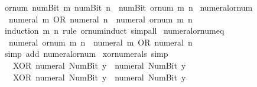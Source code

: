 \begin{isabellebody}
{\isacharbar}{\kern0pt}\ {\isacartoucheopen}or{\isacharunderscore}{\kern0pt}num\ {\isacharparenleft}{\kern0pt}num{\isachardot}{\kern0pt}Bit{}\ m{\isacharparenright}{\kern0pt}\ {\isacharparenleft}{\kern0pt}num{\isachardot}{\kern0pt}Bit{}\ n{\isacharparenright}{\kern0pt}\ {\isacharequal}{\kern0pt}\ num{\isachardot}{\kern0pt}Bit{}\ {\isacharparenleft}{\kern0pt}or{\isacharunderscore}{\kern0pt}num\ m\ n{\isacharparenright}{\kern0pt}{\isacartoucheclose}\isanewline
\isanewline
{}\isamarkupfalse%
\ numeral{\isacharunderscore}{\kern0pt}or{\isacharunderscore}{\kern0pt}num{\isacharcolon}{\kern0pt}\isanewline
\ \ {\isacartoucheopen}numeral\ m\ OR\ numeral\ n\ {\isacharequal}{\kern0pt}\ numeral\ {\isacharparenleft}{\kern0pt}or{\isacharunderscore}{\kern0pt}num\ m\ n{\isacharparenright}{\kern0pt}{\isacartoucheclose}\isanewline
%
\isadelimproof
\ \ %
\endisadelimproof
%
\isatagproof
{}\isamarkupfalse%
\ {\isacharparenleft}{\kern0pt}induction\ m\ n\ rule{\isacharcolon}{\kern0pt}\ or{\isacharunderscore}{\kern0pt}num{\isachardot}{\kern0pt}induct{\isacharparenright}{\kern0pt}\ simp{\isacharunderscore}{\kern0pt}all%
\endisatagproof
{\isafoldproof}%
%
\isadelimproof
\isanewline
%
\endisadelimproof
\isanewline
{}\isamarkupfalse%
\ numeral{\isacharunderscore}{\kern0pt}or{\isacharunderscore}{\kern0pt}num{\isacharunderscore}{\kern0pt}eq{\isacharcolon}{\kern0pt}\isanewline
\ \ {\isacartoucheopen}numeral\ {\isacharparenleft}{\kern0pt}or{\isacharunderscore}{\kern0pt}num\ m\ n{\isacharparenright}{\kern0pt}\ {\isacharequal}{\kern0pt}\ numeral\ m\ OR\ numeral\ n{\isacartoucheclose}\isanewline
%
\isadelimproof
\ \ %
\endisadelimproof
%
\isatagproof
{}\isamarkupfalse%
\ {\isacharparenleft}{\kern0pt}simp\ add{\isacharcolon}{\kern0pt}\ numeral{\isacharunderscore}{\kern0pt}or{\isacharunderscore}{\kern0pt}num{\isacharparenright}{\kern0pt}%
\endisatagproof
{\isafoldproof}%
%
\isadelimproof
\isanewline
%
\endisadelimproof
\isanewline
{}\isamarkupfalse%
\ xor{\isacharunderscore}{\kern0pt}numerals\ {\isacharbrackleft}{\kern0pt}simp{\isacharbrackright}{\kern0pt}{\isacharcolon}{\kern0pt}\isanewline
\ \ {\isacartoucheopen}{}\ XOR\ numeral\ {\isacharparenleft}{\kern0pt}Num{\isachardot}{\kern0pt}Bit{}\ y{\isacharparenright}{\kern0pt}\ {\isacharequal}{\kern0pt}\ numeral\ {\isacharparenleft}{\kern0pt}Num{\isachardot}{\kern0pt}Bit{}\ y{\isacharparenright}{\kern0pt}{\isacartoucheclose}\isanewline
\ \ {\isacartoucheopen}{}\ XOR\ numeral\ {\isacharparenleft}{\kern0pt}Num{\isachardot}{\kern0pt}Bit{}\ y{\isacharparenright}{\kern0pt}\ {\isacharequal}{\kern0pt}\ numeral\ {\isacharparenleft}{\kern0pt}Num{\isachardot}{\kern0pt}Bit{}\ y{\isacharparenright}{\kern0pt}{\isacartoucheclose}\isanewline

\end{isabellebody}
